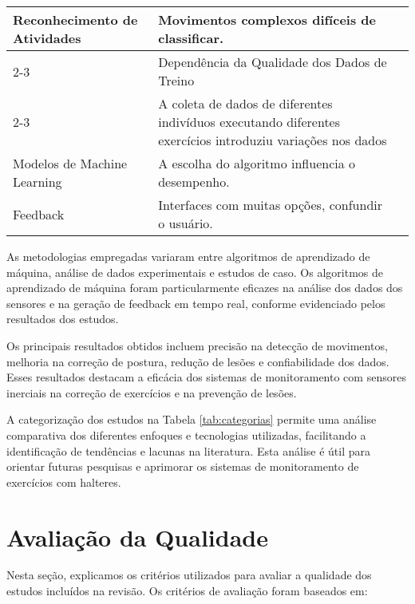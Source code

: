 \documentclass[conference]{IEEEtran}
\begin{document}
\begin{table*}
\begin{tabularx}{\textwidth}{|p{3cm}|X|p{3cm}|}
    Reconhecimento de Atividades & Movimentos complexos difíceis de classificar. & \cite{Tian2021, Asghar2023, Bian2022} \\ \cline{2-3}

    & Dependência da Qualidade dos Dados de Treino & \cite{Ponton2023, Asghar2023,Kwon2021} \\ \cline{2-3}
    
    & A coleta de dados de diferentes indivíduos executando diferentes exercícios introduziu variações nos dados & \cite{Asghar2023} \\ \hline


    Modelos de Machine Learning & A escolha do algoritmo influencia o desempenho. & \cite{Tian2021, papadopoulou2023towards}\\  \hline
    
    Feedback & Interfaces com muitas opções, confundir o usuário. & \cite{papadopoulou2023towards}\\ \hline


    \end{tabularx}
    \label{tab:categorias}
\end{table*}

As metodologias empregadas variaram entre algoritmos de aprendizado de máquina, análise de dados experimentais e estudos de caso. Os algoritmos de aprendizado de máquina foram particularmente eficazes na análise dos dados dos sensores e na geração de feedback em tempo real, conforme evidenciado pelos resultados dos estudos.

Os principais resultados obtidos incluem precisão na detecção de movimentos, melhoria na correção de postura, redução de lesões e confiabilidade dos dados. Esses resultados destacam a eficácia dos sistemas de monitoramento com sensores inerciais na correção de exercícios e na prevenção de lesões.

A categorização dos estudos na Tabela \ref{tab:categorias} permite uma análise comparativa dos diferentes enfoques e tecnologias utilizadas, facilitando a identificação de tendências e lacunas na literatura. Esta análise é útil para orientar futuras pesquisas e aprimorar os sistemas de monitoramento de exercícios com halteres.

\newpage

\section{Avaliação da Qualidade}
\label{sec:avaliacao}
Nesta seção, explicamos os critérios utilizados para avaliar a qualidade dos estudos incluídos na revisão. Os critérios de avaliação foram baseados em:
\end{document}
